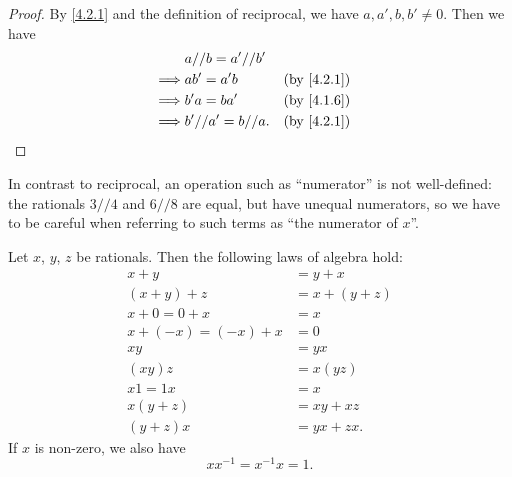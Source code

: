 \begin{proof}
  By \cref{4.2.1} and the definition of reciprocal, we have \(a, a', b, b' \neq 0\).
  Then we have
  \begin{align*}
             & a // b = a' // b'                                \\
    \implies & ab' = a'b          &  & \text{(by \cref{4.2.1})} \\
    \implies & b'a = ba'          &  & \text{(by \cref{4.1.6})} \\
    \implies & b' // a' = b // a. &  & \text{(by \cref{4.2.1})}
  \end{align*}
\end{proof}

\begin{note}
  In contrast to reciprocal, an operation such as ``numerator'' is not well-defined:
  the rationals \(3 // 4\) and \(6 // 8\) are equal, but have unequal numerators, so we have to be careful when referring to such terms as ``the numerator of \(x\)''.
\end{note}

\begin{prop}\label{4.2.4}
  Let \(x\), \(y\), \(z\) be rationals.
  Then the following laws of algebra hold:
  \begin{align*}
    x + y               & = y + x       \\
    (x + y) + z         & = x + (y + z) \\
    x + 0 = 0 + x       & = x           \\
    x + (-x) = (-x) + x & = 0           \\
    xy                  & = yx          \\
    (xy)z               & = x(yz)       \\
    x1 = 1x             & = x           \\
    x(y + z)            & = xy + xz     \\
    (y + z)x            & = yx + zx.
  \end{align*}
  If \(x\) is non-zero, we also have
  \[
    xx^{-1} = x^{-1}x = 1.
  \]
\end{prop}

